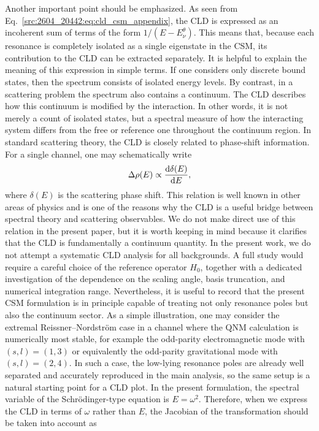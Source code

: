 Another important point should be emphasized. As seen from Eq.~\eqref{src:2604_20442:eq:cld_csm_appendix}, the CLD is expressed as an incoherent sum of terms of the form $1/(E-E^\theta_\nu)$. This means that, because each resonance is completely isolated as a single eigenstate in the CSM, its contribution to the CLD can be extracted separately.
It is helpful to explain the meaning of this expression in simple terms.
If one considers only discrete bound states, then the spectrum consists of
isolated energy levels.
By contrast, in a scattering problem the spectrum also contains a continuum.
The CLD describes how this continuum is modified by the interaction.
In other words, it is not merely a count of isolated states, but a spectral
measure of how the interacting system differs from the free or reference one
throughout the continuum region.
In standard scattering theory, the CLD is closely related to phase-shift
information.
For a single channel, one may schematically write
\begin{align}
    \Delta \rho(E)
    \propto
    \frac{\mathrm{d} \delta(E)}{\mathrm{d} E},
\end{align}
where $\delta(E)$ is the scattering phase shift.
This relation is well known in other areas of physics and is one of the
reasons why the CLD is a useful bridge between spectral theory and scattering
observables.
We do not make direct use of this relation in the present paper, but it is
worth keeping in mind because it clarifies that the CLD is fundamentally a
continuum quantity.
In the present work, we do not attempt a systematic CLD analysis for all
backgrounds.
A full study would require a careful choice of the reference operator $H_0$,
together with a dedicated investigation of the dependence on the scaling
angle, basis truncation, and numerical integration range.
Nevertheless, it is useful to record that the present CSM formulation is in
principle capable of treating not only resonance poles but also the continuum
sector.
As a simple illustration, one may consider the extremal
Reissner--Nordstr\"om case in a channel where the QNM calculation is
numerically most stable, for example the odd-parity electromagnetic mode with
$(s,l)=(1,3)$ or equivalently the odd-parity gravitational mode with
$(s,l)=(2,4)$.
In such a case, the low-lying resonance poles are already well separated and
accurately reproduced in the main analysis, so the same setup is a natural
starting point for a CLD plot.
In the present formulation, the spectral variable of the Schr\"odinger-type equation is $E=\omega^2$. Therefore, when we express the CLD in terms of $\omega$ rather than $E$, the Jacobian of the transformation should be taken into account as
